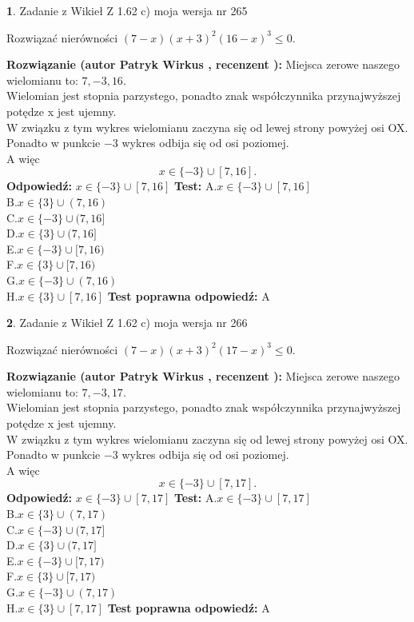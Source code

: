 \documentclass[12pt, a4paper]{article}
\theoremstyle{definition} %
\newtheorem{zad}{}
\newcommand{\zadStart}[1]{\begin{zad}#1\newline}
\newcommand{\zadStop}{\end{zad}}
\newcommand{\rozwStart}[2]{\noindent \textbf{Rozwiązanie (autor #1 , recenzent #2): }\newline}
\newcommand{\rozwStop}{\newline}
\newcommand{\odpStart}{\noindent \textbf{Odpowiedź:}\newline}
\newcommand{\odpStop}{\newline}
\newcommand{\testStart}{\noindent \textbf{Test:}\newline}
\newcommand{\testStop}{\newline}
\newcommand{\kluczStart}{\noindent \textbf{Test poprawna odpowiedź:}\newline}
\newcommand{\kluczStop}{\newline}
\begin{document}
\zadStart{Zadanie z Wikieł Z 1.62 c) moja wersja nr 265}

Rozwiązać nierówności $(7-x)(x+3)^{2}(16-x)^{3}\le0$.
\zadStop
\rozwStart{Patryk Wirkus}{}
Miejsca zerowe naszego wielomianu to: $7, -3, 16$.\\
Wielomian jest stopnia parzystego, ponadto znak współczynnika przy\linebreak najwyższej potędze x jest ujemny.\\ W związku z tym wykres wielomianu zaczyna się od lewej strony powyżej osi OX.\\
Ponadto w punkcie $-3$ wykres odbija się od osi poziomej.\\
A więc $$x \in \{-3\} \cup [7,16].$$
\rozwStop
\odpStart
$x \in \{-3\} \cup [7,16]$
\odpStop
\testStart
A.$x \in \{-3\} \cup [7,16]$\\
B.$x \in \{3\} \cup (7,16)$\\
C.$x \in \{-3\} \cup (7,16]$\\
D.$x \in \{3\} \cup (7,16]$\\
E.$x \in \{-3\} \cup [7,16)$\\
F.$x \in \{3\} \cup [7,16)$\\
G.$x \in \{-3\} \cup (7,16)$\\
H.$x \in \{3\} \cup [7,16]$
\testStop
\kluczStart
A
\kluczStop



\zadStart{Zadanie z Wikieł Z 1.62 c) moja wersja nr 266}

Rozwiązać nierówności $(7-x)(x+3)^{2}(17-x)^{3}\le0$.
\zadStop
\rozwStart{Patryk Wirkus}{}
Miejsca zerowe naszego wielomianu to: $7, -3, 17$.\\
Wielomian jest stopnia parzystego, ponadto znak współczynnika przy\linebreak najwyższej potędze x jest ujemny.\\ W związku z tym wykres wielomianu zaczyna się od lewej strony powyżej osi OX.\\
Ponadto w punkcie $-3$ wykres odbija się od osi poziomej.\\
A więc $$x \in \{-3\} \cup [7,17].$$
\rozwStop
\odpStart
$x \in \{-3\} \cup [7,17]$
\odpStop
\testStart
A.$x \in \{-3\} \cup [7,17]$\\
B.$x \in \{3\} \cup (7,17)$\\
C.$x \in \{-3\} \cup (7,17]$\\
D.$x \in \{3\} \cup (7,17]$\\
E.$x \in \{-3\} \cup [7,17)$\\
F.$x \in \{3\} \cup [7,17)$\\
G.$x \in \{-3\} \cup (7,17)$\\
H.$x \in \{3\} \cup [7,17]$
\testStop
\kluczStart
A
\kluczStop
\end{document}
